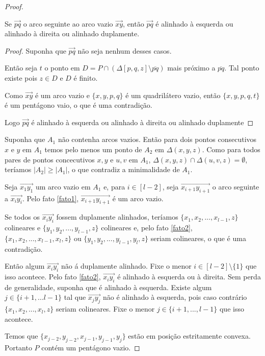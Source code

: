 \begin{proof}
    \begin{fato}\label{fato2}
        Se $\overrightarrow{pq}$ o arco seguinte ao arco vazio $\overrightarrow{xy}$, então $\overrightarrow{pq}$ é alinhado à esquerda ou alinhado à direita ou alinhado duplamente.
    \end{fato}
    \begin{proof}
        Suponha que $\overrightarrow{pq}$ não seja nenhum desses casos.

        Então seja $t$ o ponto em $D=P\cap(\Delta[p,q,z]\setminus\overline{pq})$ mais próximo a $\overline{pq}$. Tal ponto existe pois $z\in D$ e $D$ é finito.

        Como $\overrightarrow{xy}$ é um arco vazio e $\{x,y,p,q\}$ é um quadrilátero vazio, então $\{x,y,p,q,t\}$ é um pentágono vaio, o que é uma contradição.

        Logo $\overrightarrow{pq}$ é alinhado à esquerda ou alinhado à direita ou alinhado duplamente
    \end{proof}
    Suponha que $A_1$ não contenha arcos vazios. Então para dois pontos consecutivos $x$ e $y$ em $A_1$ temos pelo menos um ponto de $A_2$ em $\Delta(x,y,z)$. Como para todos pares de pontos concecutivos $x,y$ e $u,v$ em $A_1$, $\Delta(x,y,z)\cap\Delta(u,v,z)=\emptyset$, teríamos $|A_2|\geq|A_1|$, o que contradiz a minimalidade de $A_1$.

    Seja $\overrightarrow{x_1y_1}$ um arco vazio em $A_1$ e, para $i\in[l-2]$, seja $\overrightarrow{x_{i+1}y_{i+1}}$ o arco seguinte a $\overrightarrow{x_iy_i}$. Pelo fato \ref{fato1}, $\overrightarrow{x_{i+1}y_{i+1}}$ é um arco vazio.

    Se todos os $\overrightarrow{x_iy_i}$ fossem duplamente alinhados, teríamos $\{x_1,x_2,...,x_{l-1},z\}$ colineares e $\{y_1,y_2,...,y_{l-1},z\}$ colineares e, pelo fato \ref{fato2}, $\{x_1,x_2,...,x_{l-1},x_l,z\}$ ou $\{y_1,y_2,...,y_{l-1},y_l,z\}$ seriam colineares, o que é uma contradição.

    Então algum $\overrightarrow{x_iy_i}$ não á duplamente alinhado. Fixe o menor $i\in[l-2]\setminus\{1\}$ que isso acontece. Pelo fato \ref{fato2}, $\overrightarrow{x_iy_i}$ é alinhado à esquerda ou à direita. Sem perda de generalidade, suponha que é alinhado à esquerda. Existe algum $j\in\{i+1,...l-1\}$ tal que $\overrightarrow{x_jy_j}$ não é alinhado à esquerda, pois caso contrário $\{x_1,x_2,...,x_l,z\}$ seriam colineares. Fixe o menor $j\in\{i+1,...,l-1\}$ que isso acontece.

    Temos que $\{x_{j-2},y_{j-2},x_{j-1},y_{j-1},y_j\}$ estão em posição estritamente convexa. Portanto $P$ contém um pentágono vazio.


\end{proof}
